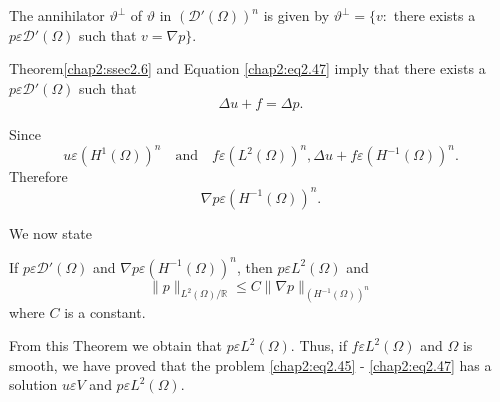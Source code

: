 \setcounter{THM}{5}
\begin{THM}\label{chap2:THM6}
The annihilator $\vartheta^\bot$ of $\vartheta$ in
$(\mathscr{D}'(\Omega))^n$ is given by $\vartheta^\bot=\{v:$ there
exists a $p\varepsilon\mathscr{D}'(\Omega)$ such that $v=\nabla p\}$. 
\end{THM}

Theorem\pageoriginale \ref{chap2:ssec2.6} and Equation
\eqref{chap2:eq2.47} imply that there exists a $p\varepsilon
\mathscr{D}'(\Omega)$ such that 
$$
\Delta u+f=\Delta p.
$$

Since 
$$
u\varepsilon(H^1(\Omega))^n\quad\text{and}\quad f\varepsilon(L^2
(\Omega))^n, \Delta u+f\varepsilon(H^{-1}(\Omega))^n.
$$
Therefore
$$
\nabla p\varepsilon(H^{-1}(\Omega))^n.
$$

We now state

\begin{THM}\label{chap2:THM7}
If $p\varepsilon\mathscr{D}'(\Omega)$ and $\nabla p\varepsilon (H^{-1}
(\Omega))^n$, then $p\varepsilon L^2(\Omega)$ and 
$$
\parallel p\parallel_{L^2(\Omega)/\mathbb{R}}\leq C\parallel\nabla p
\parallel_{(H^{-1}(\Omega))^n}
$$
where $C$ is a constant.
\end{THM}

From this Theorem we obtain that $p \varepsilon L^2(\Omega)$. Thus, if
$f\varepsilon L^2(\Omega)$ and $\Omega$ is smooth, we have proved that
the problem \eqref{chap2:eq2.45} - \eqref{chap2:eq2.47} has a solution
$u\varepsilon V$ and $p\varepsilon L^2(\Omega)$. 
